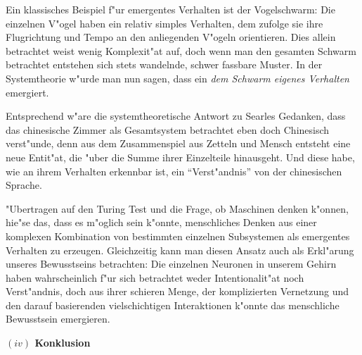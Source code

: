 \documentclass[a4paper, emulatestandardclasses, 12pt]{scrartcl}
\begin{document}
\begin{onehalfspace}
Ein klassisches Beispiel f"ur emergentes Verhalten ist der Vogelschwarm: Die einzelnen V"ogel haben ein relativ simples Verhalten, dem zufolge sie ihre Flugrichtung und Tempo an den anliegenden V"ogeln orientieren. Dies allein betrachtet weist wenig Komplexit"at auf, doch wenn man den gesamten Schwarm betrachtet entstehen sich stets wandelnde, schwer fassbare Muster. In der Systemtheorie w"urde man nun sagen, dass ein \emph{dem Schwarm eigenes Verhalten} emergiert.

Entsprechend w"are die systemtheoretische Antwort zu Searles Gedanken, dass das chinesische Zimmer als Gesamtsystem betrachtet eben doch Chinesisch verst"unde, denn aus dem Zusammenspiel aus Zetteln und Mensch entsteht eine neue Entit"at, die "uber die Summe ihrer Einzelteile hinausgeht. Und diese habe, wie an ihrem Verhalten erkennbar ist, ein "`Verst"andnis"' von der chinesischen Sprache.

"Ubertragen auf den Turing Test und die Frage, ob Maschinen denken k"onnen, hie"se das, dass es m"oglich sein k"onnte, menschliches Denken aus einer komplexen Kombination von bestimmten einzelnen Subsystemen als emergentes Verhalten zu erzeugen. Gleichzeitig kann man diesen Ansatz auch als Erkl"arung unseres Bewusstseins betrachten: Die einzelnen Neuronen in unserem Gehirn haben wahrscheinlich f"ur sich betrachtet weder Intentionalit"at noch Verst"andnis, doch aus ihrer schieren Menge, der komplizierten Vernetzung und den darauf basierenden vielschichtigen Interaktionen k"onnte das menschliche Bewusstsein emergieren.

\vspace{5mm}
\noindent\textbf{$(iv)$ Konklusion}


 
 


\end{onehalfspace}
\end{document}

